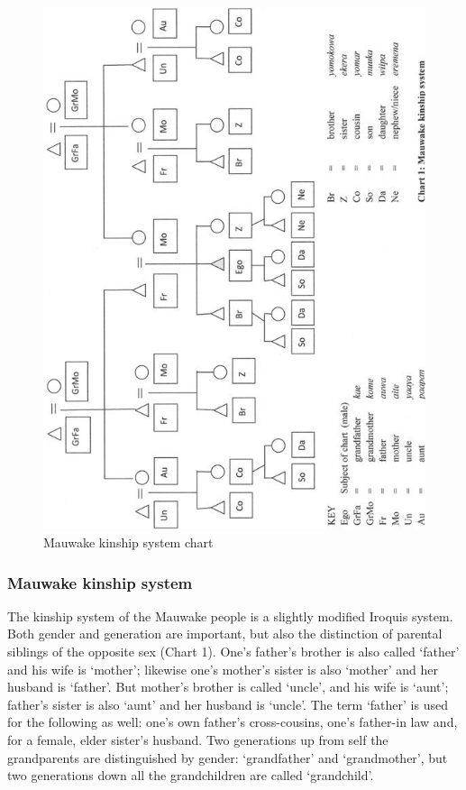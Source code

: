 \begin{figure}
\caption{Mauwake kinship system chart}
\label{ }
\includegraphics[width=\textwidth]{figures/1-mauwake_kinship_system_chart.jpeg}
\end{figure}
 



\subsubsection{Mauwake kinship system} \label{sec:1.3.6}
The kinship system of the Mauwake people is a slightly modified Iroquis system. Both gender and generation are important, but also the distinction of parental siblings of the opposite sex (Chart 1). One's father's brother is also called  `father' and his wife is  `mother'; likewise one's mother's sister is also `mother' and her husband is `father'. But mother's brother is called  `uncle', and his wife is  `aunt'; father's sister is also `aunt' and her husband is `uncle'. The term `father' is used for the following as well: one's own father's cross-cousins, one's father-in law and, for a female, elder sister's husband. Two generations up from self the grandparents are distinguished by gender:  `grandfather' and  `grandmother', but two generations down all the grandchildren are called  `grandchild'. 

